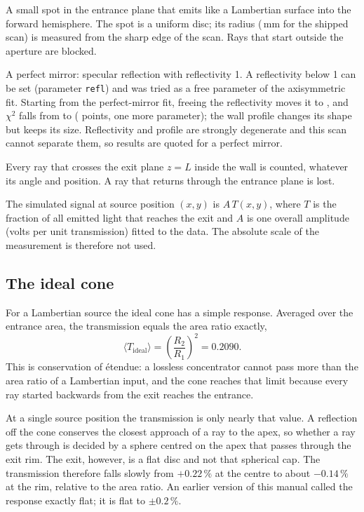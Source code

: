 \documentclass[11pt,a4paper]{article}
\newcommand{\code}[1]{\texttt{#1}}
\begin{document}
\begin{description}[leftmargin=1.6em]
\item[Source] A small spot in the entrance plane that emits like a Lambertian surface into the
forward hemisphere. The spot is a uniform disc; its radius (\SpotR\,mm for the shipped scan) is
measured from the sharp edge of the scan. Rays that start outside the aperture are blocked.
\item[Wall] A perfect mirror: specular reflection with reflectivity 1. A reflectivity below 1 can be
set (parameter \code{refl}) and was tried as a free parameter of the axisymmetric fit. Starting from
the perfect-mirror fit, freeing the reflectivity moves it to \ReflFit, and $\chi^2$ falls from
\ReflChiFixed{} to \ReflChi{} (\ReflNpts{} points, one more parameter); the wall profile changes its
shape but keeps its size. Reflectivity and profile are strongly degenerate and this scan cannot
separate them, so results are quoted for a perfect mirror.
\item[Detector] Every ray that crosses the exit plane $z=L$ inside the wall is counted, whatever its
angle and position. A ray that returns through the entrance plane is lost.
\end{description}

The simulated signal at source position $(x,y)$ is $A\,T(x,y)$, where $T$ is the fraction of all
emitted light that reaches the exit and $A$ is one overall amplitude (volts per unit transmission)
fitted to the data. The absolute scale of the measurement is therefore not used.

\subsection{The ideal cone}
\label{sec:ideal}

For a Lambertian source the ideal cone has a simple response. Averaged over the entrance area, the
transmission equals the area ratio exactly,
\[
  \langle T_\mathrm{ideal}\rangle = \left(\frac{R_2}{R_1}\right)^2 = 0.2090 .
\]
This is conservation of \'etendue: a lossless concentrator cannot pass more than the area ratio of a
Lambertian input, and the cone reaches that limit because every ray started backwards from the exit
reaches the entrance.

At a single source position the transmission is only nearly that value. A reflection off the cone
conserves the closest approach of a ray to the apex, so whether a ray gets through is decided by a
sphere centred on the apex that passes through the exit rim. The exit, however, is a flat disc and
not that spherical cap. The transmission therefore falls slowly from $+0.22\,\%$ at the centre to
about $-0.14\,\%$ at the rim, relative to the area ratio. An earlier version of this manual called
the response exactly flat; it is flat to $\pm0.2\,\%$.
\end{document}
